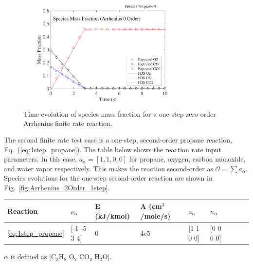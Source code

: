 \documentclass[11pt]{book}
\begin{document}
\begin{figure}[h!]
\begin{center}
\includegraphics[height=2.2in]{SCRIPT_FIGURES/reactionrate_arrhenius_0order_1step}
\end{center}
\caption[Species evolution in a 0-order 1-step finite rate reaction]{Time evolution of species mass fraction for a one-step zero-order Arrhenius finite rate reaction.}
\label{fig:Arrhenius_0Order_1step}
\end{figure}
The second finite rate test case is a one-step, second-order propane reaction, Eq.~(\ref{eq:1step_propane}). The table below shows the reaction rate input parameters. In this case, $a_{\alpha}=[1,1,0,0]$  for propane, oxygen, carbon monoxide, and water vapor respectively. This makes the reaction second-order as $\mathcal{O}=\sum a_{\alpha}$. Species evolutions for the one-step second-order reaction are shown in Fig.~\ref{fig:Arrhenius_2Order_1step}.

\begin{center}
\begin{tabular}{|l|l|l|l|l|l|l|l|l|}
\hline Reaction & $\nu_{\alpha}$ & E (kJ/kmol) & A (cm$^3$/mole/s) & $a_{\alpha}$ & $n_{\alpha}$  \\ \hline \hline
\ref{eq:1step_propane} & [-1 -5 3 4] & 0 & 4e5 & [1 1 0 0] & [0 0 0 0] \\ \hline
\end{tabular}
\vskip8pt
$\alpha$ is defined as [$\mathrm{C_3H_8}$ $\mathrm{O_2}$ $\mathrm{CO_2}$ $\mathrm{H_2O}$].
\end{center}
\end{document}
